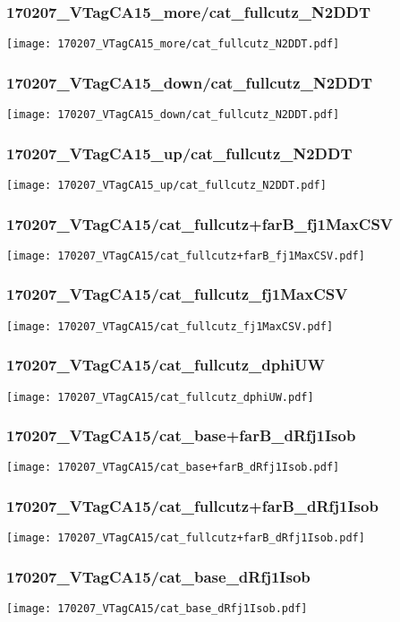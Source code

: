 \begin{frame}
   \frametitle{\small 170207\_VTagCA15\_more/cat\_fullcutz\_N2DDT}
   \centering
   \texttt{[image: 170207\_VTagCA15\_more/cat\_fullcutz\_N2DDT.pdf]}
\end{frame}

\begin{frame}
   \frametitle{\small 170207\_VTagCA15\_down/cat\_fullcutz\_N2DDT}
   \centering
   \texttt{[image: 170207\_VTagCA15\_down/cat\_fullcutz\_N2DDT.pdf]}
\end{frame}

\begin{frame}
   \frametitle{\small 170207\_VTagCA15\_up/cat\_fullcutz\_N2DDT}
   \centering
   \texttt{[image: 170207\_VTagCA15\_up/cat\_fullcutz\_N2DDT.pdf]}
\end{frame}

\begin{frame}
   \frametitle{\small 170207\_VTagCA15/cat\_fullcutz+farB\_fj1MaxCSV}
   \centering
   \texttt{[image: 170207\_VTagCA15/cat\_fullcutz+farB\_fj1MaxCSV.pdf]}
\end{frame}

\begin{frame}
   \frametitle{\small 170207\_VTagCA15/cat\_fullcutz\_fj1MaxCSV}
   \centering
   \texttt{[image: 170207\_VTagCA15/cat\_fullcutz\_fj1MaxCSV.pdf]}
\end{frame}

\begin{frame}
   \frametitle{\small 170207\_VTagCA15/cat\_fullcutz\_dphiUW}
   \centering
   \texttt{[image: 170207\_VTagCA15/cat\_fullcutz\_dphiUW.pdf]}
\end{frame}

\begin{frame}
   \frametitle{\small 170207\_VTagCA15/cat\_base+farB\_dRfj1Isob}
   \centering
   \texttt{[image: 170207\_VTagCA15/cat\_base+farB\_dRfj1Isob.pdf]}
\end{frame}

\begin{frame}
   \frametitle{\small 170207\_VTagCA15/cat\_fullcutz+farB\_dRfj1Isob}
   \centering
   \texttt{[image: 170207\_VTagCA15/cat\_fullcutz+farB\_dRfj1Isob.pdf]}
\end{frame}

\begin{frame}
   \frametitle{\small 170207\_VTagCA15/cat\_base\_dRfj1Isob}
   \centering
   \texttt{[image: 170207\_VTagCA15/cat\_base\_dRfj1Isob.pdf]}
\end{frame}


